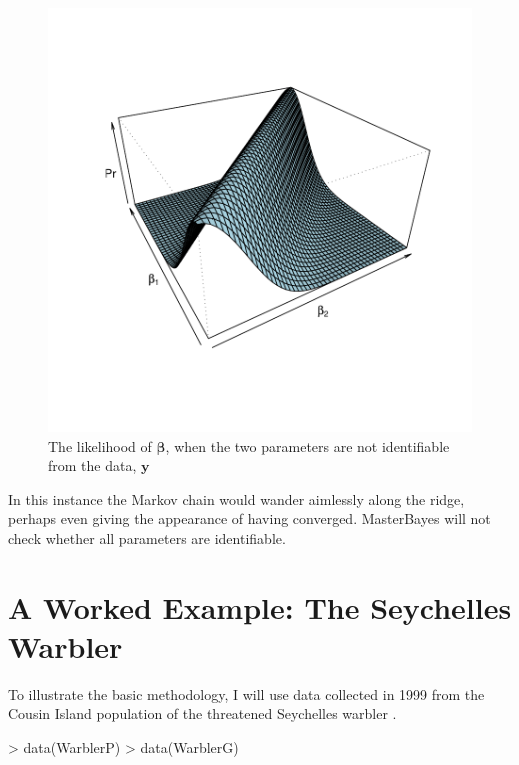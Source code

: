 \documentclass{article}
\begin{document}
\begin{figure}[!h]
\begin{center}
\includegraphics{Tutorial-009}
\end{center}
\caption{The likelihood of $\bm{\beta}$, when the two parameters are not identifiable from the data, $\bm{y}$}
\label{likP}
\end{figure}

In this instance the Markov chain would wander aimlessly along the ridge, perhaps even giving the appearance of having converged.  MasterBayes will not check whether all parameters are identifiable.

\section{\large{A Worked Example: The Seychelles Warbler}}
\label{Warbler-sec}

To illustrate the basic methodology, I will use data collected in 1999 from the Cousin Island population of the threatened Seychelles warbler \citep{Richardson.2001}. 

\begin{Schunk}
\begin{Sinput}
> data(WarblerP)
> data(WarblerG)
\end{Sinput}
\end{Schunk}
\end{document}
